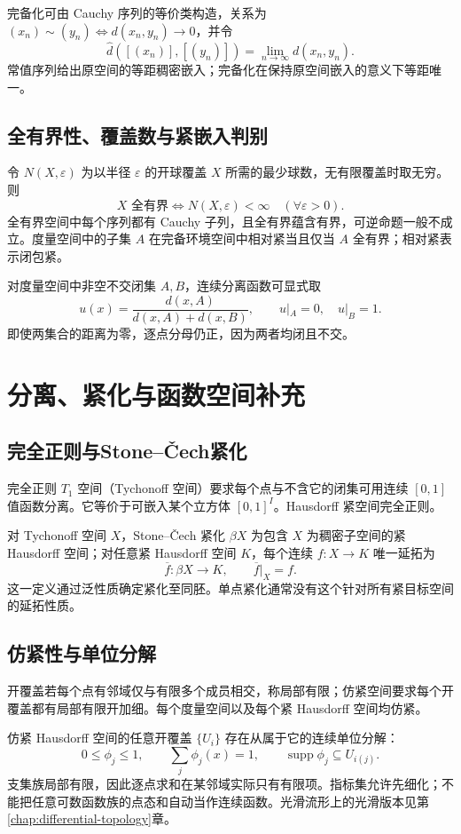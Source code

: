 \documentclass[../main.tex]{subfiles}
\begin{document}
完备化可由 Cauchy 序列的等价类构造，关系为 $(x_n)\sim(y_n)\iff d(x_n,y_n)\to0$，并令
\[
\widehat d([(x_n)],[(y_n)])=\lim_{n\to\infty}d(x_n,y_n).
\]
常值序列给出原空间的等距稠密嵌入；完备化在保持原空间嵌入的意义下等距唯一。

\subsection{全有界性、覆盖数与紧嵌入判别}
令 $N(X,\varepsilon)$ 为以半径 $\varepsilon$ 的开球覆盖 $X$ 所需的最少球数，无有限覆盖时取无穷。则
\[
X\text{ 全有界}\iff N(X,\varepsilon)<\infty\quad(\forall\varepsilon>0).
\]
全有界空间中每个序列都有 Cauchy 子列，且全有界蕴含有界，可逆命题一般不成立。度量空间中的子集 $A$ 在完备环境空间中相对紧当且仅当 $A$ 全有界；相对紧表示闭包紧。

对度量空间中非空不交闭集 $A,B$，连续分离函数可显式取
\[
u(x)=\frac{d(x,A)}{d(x,A)+d(x,B)},\qquad u|_A=0,\quad u|_B=1.
\]
即使两集合的距离为零，逐点分母仍正，因为两者均闭且不交。

\section{分离、紧化与函数空间补充}
\subsection{完全正则与Stone--Čech紧化}
完全正则 $T_1$ 空间（Tychonoff 空间）要求每个点与不含它的闭集可用连续 $[0,1]$ 值函数分离。它等价于可嵌入某个立方体 $[0,1]^I$。Hausdorff 紧空间完全正则。

对 Tychonoff 空间 $X$，Stone--Čech 紧化 $\beta X$ 为包含 $X$ 为稠密子空间的紧 Hausdorff 空间；对任意紧 Hausdorff 空间 $K$，每个连续 $f:X\to K$ 唯一延拓为
\[
\overline f:\beta X\to K,\qquad\overline f|_X=f.
\]
这一定义通过泛性质确定紧化至同胚。单点紧化通常没有这个针对所有紧目标空间的延拓性质。

\subsection{仿紧性与单位分解}
开覆盖若每个点有邻域仅与有限多个成员相交，称局部有限；仿紧空间要求每个开覆盖都有局部有限开加细。每个度量空间以及每个紧 Hausdorff 空间均仿紧。

仿紧 Hausdorff 空间的任意开覆盖 $\{U_i\}$ 存在从属于它的连续单位分解：
\[
0\le\phi_j\le1,\qquad \sum_j\phi_j(x)=1,\qquad
\operatorname{supp}\phi_j\subseteq U_{i(j)}.
\]
支集族局部有限，因此逐点求和在某邻域实际只有有限项。指标集允许先细化；不能把任意可数函数族的点态和自动当作连续函数。光滑流形上的光滑版本见第\ref{chap:differential-topology}章。
\end{document}
